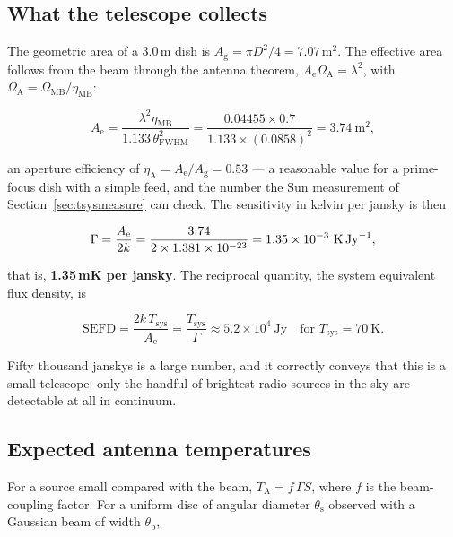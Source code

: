 \documentclass[11pt,a4paper]{article}
\begin{document}
\subsection{What the telescope collects}

The geometric area of a 3.0\,m dish is $A_\text{g} = \pi D^2/4 = 7.07$\,m$^2$. The effective area follows from the beam through the antenna theorem, $A_\text{e}\Omega_\text{A} = \lambda^2$, with $\Omega_\text{A} = \Omega_\text{MB}/\eta_\text{MB}$:

\begin{equation}
A_\text{e} = \frac{\lambda^2 \eta_\text{MB}}{1.133\,\theta_\text{FWHM}^2}
= \frac{0.04455 \times 0.7}{1.133 \times (0.0858)^2} = 3.74\ \text{m}^2,
\end{equation}

an aperture efficiency of $\eta_\text{A} = A_\text{e}/A_\text{g} = 0.53$ --- a reasonable value for a prime-focus dish with a simple feed, and the number the Sun measurement of Section~\ref{sec:tsysmeasure} can check. The sensitivity in kelvin per jansky is then

\begin{equation}
\Gamma = \frac{A_\text{e}}{2k} = \frac{3.74}{2 \times 1.381\times10^{-23}}
= 1.35\times10^{-3}\ \text{K\,Jy}^{-1},
\label{eq:gamma}
\end{equation}

that is, \textbf{1.35\,mK per jansky}. The reciprocal quantity, the system equivalent flux density, is

\begin{equation}
\text{SEFD} = \frac{2k\,T_\text{sys}}{A_\text{e}} = \frac{T_\text{sys}}{\Gamma}
\approx 5.2\times10^{4}\ \text{Jy} \quad \text{for } T_\text{sys} = 70\ \text{K}.
\label{eq:sefd}
\end{equation}

Fifty thousand janskys is a large number, and it correctly conveys that this is a small telescope: only the handful of brightest radio sources in the sky are detectable at all in continuum.

\subsection{Expected antenna temperatures}

For a source small compared with the beam, $T_\text{A} = f\,\Gamma S$, where $f$ is the beam-coupling factor. For a uniform disc of angular diameter $\theta_\text{s}$ observed with a Gaussian beam of width $\theta_\text{b}$,
\end{document}
